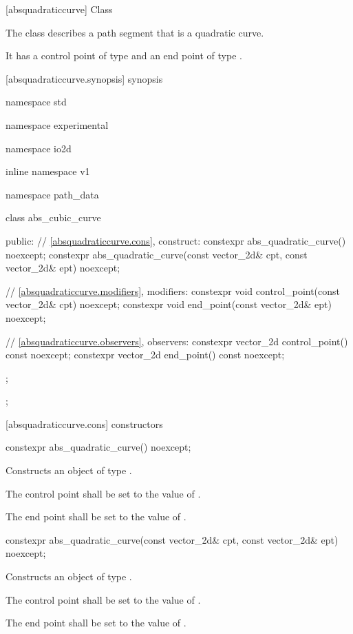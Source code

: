  [absquadraticcurve] {Class }

\pnum
{}
The class  describes a path segment that is a quadratic \bezierlocal curve.

\pnum
It has a control point of type  and an end point of type .

 [absquadraticcurve.synopsis] { synopsis}

\begin{codeblock}
namespace std { namespace experimental { namespace io2d { inline namespace v1 {
  namespace path_data {
    class abs_cubic_curve {
    public:
      // \ref{absquadraticcurve.cons}, construct:
      constexpr abs_quadratic_curve() noexcept;
      constexpr abs_quadratic_curve(const vector_2d& cpt, const vector_2d& ept)
        noexcept;

      // \ref{absquadraticcurve.modifiers}, modifiers:
      constexpr void control_point(const vector_2d& cpt) noexcept;
      constexpr void end_point(const vector_2d& ept) noexcept;

      // \ref{absquadraticcurve.observers}, observers:
      constexpr vector_2d control_point() const noexcept;
      constexpr vector_2d end_point() const noexcept;
    };
  };
} } } }
\end{codeblock}

 [absquadraticcurve.cons] { constructors}

\begin{itemdecl}
constexpr abs_quadratic_curve() noexcept;
\end{itemdecl}
\begin{itemdescr}
\pnum
\effects
Constructs an object of type .

\pnum
The control point shall be set to the value of .

\pnum
The end point shall be set to the value of .
\end{itemdescr}

\begin{itemdecl}
constexpr abs_quadratic_curve(const vector_2d& cpt, const vector_2d& ept)
  noexcept;
\end{itemdecl}
\begin{itemdescr}
\pnum
\effects
Constructs an object of type .

\pnum
The control point shall be set to the value of .

\pnum
The end point shall be set to the value of .
\end{itemdescr}


